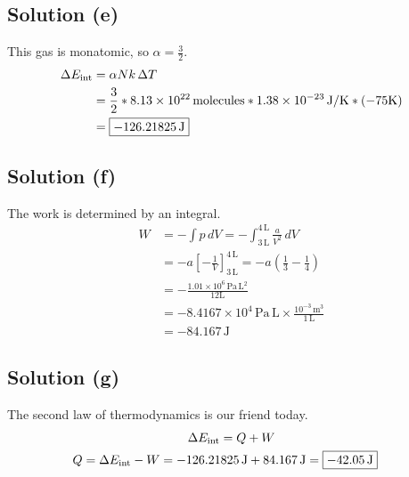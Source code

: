 \documentclass[12pt]{article}
\newcommand{\E}[1]{\times 10^{#1}}
\begin{document}
        \subsection{Solution (e)}
            This gas is monatomic, so $\alpha = \frac{3}{2}$.
            \begin{align}
                \Delta E_{\rm int}  &=  \alpha Nk\,\Delta T\\
                    &=  \frac{3}{2} * 8.13\E{22}\,\text{molecules} * 1.38\E{-23}\,\unit{\joule/\kelvin} * (-75\unit{\kelvin})\\
                    &=  \boxed{-126.21825\,\unit{\joule}}
            \end{align}

        \subsection{Solution (f)}
            The work is determined by an integral.
            \begin{align}
                W   &=  -\int p\,dV
                    =   -\int_{3\,\unit{\liter}}^{4\,\unit{\liter}} \frac{a}{V^2}\,dV\\
                    &=  -a \left[ -\frac{1}{V} \right]_{3\,\unit{\liter}}^{4\,\unit{\liter}}
                    =   -a\left( \frac{1}{3} - \frac{1}{4} \right)\\
                    &=  -\frac{1.01\E{6}\,\unit{\pascal\,\liter^2}}{12\unit{\liter}}\\
                    &=  -8.4167\E{4}\,\unit{\pascal\,\liter} \times \frac{10^{-3}\,\unit{\meter^3}}{1\,\unit{\liter}}\\
                    &=  \boxed{-84.167\,\unit{\joule}}
            \end{align}

        \subsection{Solution (g)}
            The second law of thermodynamics is our friend today.
            \begin{gather}
                \Delta E_{\rm int}  =   Q + W\\
                \begin{align}
                    Q   &=  \Delta E_{\rm int} - W
                        =   -126.21825\,\unit{\joule} + 84.167\,\unit{\joule}
                        =   \boxed{-42.05\,\unit{\joule}}
                \end{align}
            \end{gather}
\end{document}
